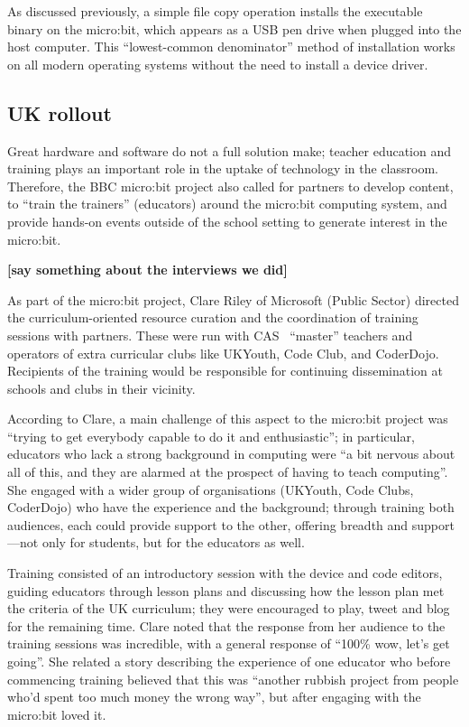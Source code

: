As discussed previously, a simple file copy operation installs the
executable binary on the micro:bit, which appears as a USB pen drive
when plugged into the host computer. This ``lowest-common denominator''
method of installation works on all modern operating systems without
the need to install a device driver. 

\subsection{UK rollout}

Great hardware and software do not a full solution make; 
teacher education and training plays an important role in 
the uptake of technology in the classroom. 
Therefore,
the BBC micro:bit project also called for partners to develop content,
to ``train the trainers'' (educators) around the micro:bit computing
system, and provide hands-on events outside of the school setting to
generate interest in the micro:bit.

{\bf [say something about the interviews we did]}

As part of the micro:bit project, Clare Riley of Microsoft (Public Sector) directed the curriculum-oriented resource curation and the coordination of training sessions with partners. These were run with CAS~\cite{crick2011computing} ``master'' teachers and operators of extra curricular clubs like UKYouth, Code Club, and CoderDojo. Recipients of the training would be responsible for continuing dissemination at schools and clubs in their vicinity.


According to Clare,
a main challenge of this aspect to the micro:bit project was ``trying to get everybody capable to do it and enthusiastic''; in particular, educators who lack a strong background in computing were ``a bit nervous about all of this, and they are alarmed at the prospect of having to teach computing''. She engaged with a wider group of organisations (UKYouth, Code Clubs, CoderDojo) who have the experience and the background; through training both audiences, each could provide support to the other, offering breadth and support---not only for students, but for the educators as well.

Training consisted of an introductory session with the device and code editors, guiding educators through lesson plans and discussing how the lesson plan met the criteria of the UK curriculum; they were encouraged to play, tweet and blog for the remaining time. Clare noted that the response from her audience to the training sessions was incredible, with a general response of ``100\% wow, let's get going''. She related a story describing the experience of one educator who before commencing training believed that this was ``another rubbish project from people who'd spent too much money the wrong way'', but after engaging with the micro:bit loved it. 

